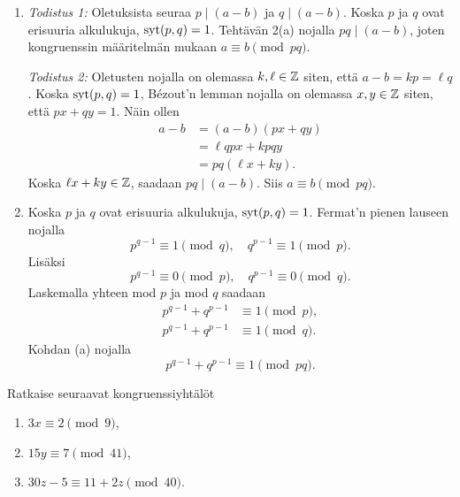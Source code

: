 \documentclass[11pt,a4paper]{amsart}
\begin{document}
\begin{solution}
  \leavevmode\par
  \begin{enumerate}[label=(\alph*), nosep]
    \item \emph{Todistus 1:} Oletuksista seuraa \(p \mid (a-b)\) ja
      \(q \mid (a-b)\).
      Koska \(p\) ja \(q\) ovat erisuuria alkulukuja, \(\operatorname{syt}(p, q) = 1\).
      Tehtävän 2(a) nojalla \(pq \mid (a-b)\), joten kongruenssin
      määritelmän mukaan \(a \equiv b \pmod{pq}\).

      \emph{Todistus 2:} Oletusten nojalla on olemassa \(k, \ell \in \mathbb{Z}\)
      siten, että \(a-b = kp = \ell q\). Koska \(\operatorname{syt}(p, q) = 1\),
      Bézout'n lemman nojalla on olemassa \(x, y \in \mathbb{Z}\) siten,
      että \(px + qy = 1\). Näin ollen
      \[
        \begin{aligned}
          a-b &= (a-b)(px + qy) \\
          &= \ell qpx + kpqy \\
          &= pq(\ell x + ky).
        \end{aligned}
      \]
      Koska \(\ell x + ky \in \mathbb{Z}\), saadaan \(pq \mid (a-b)\).
      Siis \(a \equiv b \pmod{pq}\).
    \item Koska \(p\) ja \(q\) ovat erisuuria alkulukuja, \(\operatorname{syt}(p, q) = 1\).
      Fermat'n pienen lauseen nojalla
      \[
        p^{q - 1} \equiv 1 \pmod{q}, \quad q^{p - 1} \equiv 1 \pmod{p}.
      \]
      Lisäksi
      \[
        p^{q - 1} \equiv 0 \pmod{p}, \quad q^{p - 1} \equiv 0 \pmod{q}.
      \]
      Laskemalla yhteen mod \(p\) ja mod \(q\) saadaan
      \[
        \begin{aligned}
          p^{q - 1} + q^{p - 1} &\equiv 1 \pmod{p}, \\
          p^{q - 1} + q^{p - 1} &\equiv 1 \pmod{q}.
        \end{aligned}
      \]
      Kohdan (a) nojalla
      \[
        p^{q - 1} + q^{p - 1} \equiv 1 \pmod{pq}.
      \]
  \end{enumerate}
\end{solution}

\begin{exercise}
  Ratkaise seuraavat kongruenssiyhtälöt
  \begin{enumerate}[label=(\alph*), nosep]
    \item \(3x \equiv 2 \pmod{9}\),
    \item \(15y \equiv 7 \pmod{41}\),
    \item \(30z - 5 \equiv 11 + 2z \pmod{40}\).
  \end{enumerate}
\end{exercise}
\end{document}
